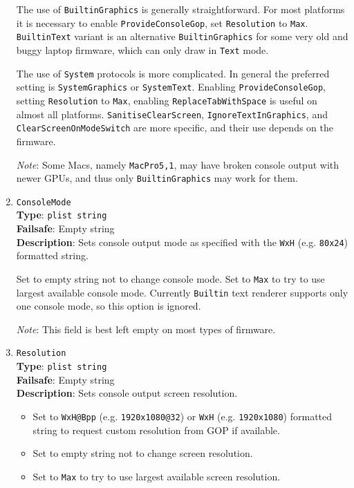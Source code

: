 \documentclass[]{article}
\providecommand{\tightlist}{%
  \setlength{\itemsep}{0pt}\setlength{\parskip}{0pt}}
\begin{document}
\begin{enumerate}
  The use of \texttt{BuiltinGraphics} is generally straightforward.
  For most platforms it is necessary to enable \texttt{ProvideConsoleGop},
  set \texttt{Resolution} to \texttt{Max}. \texttt{BuiltinText} variant is
  an alternative \texttt{BuiltinGraphics} for some very old and buggy laptop
  firmware, which can only draw in \texttt{Text} mode.

  The use of \texttt{System} protocols is more complicated. In general
  the preferred setting is \texttt{SystemGraphics} or \texttt{SystemText}.
  Enabling \texttt{ProvideConsoleGop}, setting \texttt{Resolution} to
  \texttt{Max}, enabling \texttt{ReplaceTabWithSpace} is useful on almost
  all platforms. \texttt{SanitiseClearScreen}, \texttt{IgnoreTextInGraphics},
  and \texttt{ClearScreenOnModeSwitch} are more specific, and their use
  depends on the firmware.

  \emph{Note}: Some Macs, namely \texttt{MacPro5,1}, may have broken
  console output with newer GPUs, and thus only \texttt{BuiltinGraphics}
  may work for them.

\item
  \texttt{ConsoleMode}\\
  \textbf{Type}: \texttt{plist\ string}\\
  \textbf{Failsafe}: Empty string\\
  \textbf{Description}: Sets console output mode as specified
  with the \texttt{WxH} (e.g. \texttt{80x24}) formatted string.

  Set to empty string not to change console mode. Set to \texttt{Max}
  to try to use largest available console mode. Currently
  \texttt{Builtin} text renderer supports only one console mode, so
  this option is ignored.

  \emph{Note}: This field is best left empty on most types of firmware.

\item
  \texttt{Resolution}\\
  \textbf{Type}: \texttt{plist\ string}\\
  \textbf{Failsafe}: Empty string\\
  \textbf{Description}: Sets console output screen resolution.

  \begin{itemize}
  \tightlist
  \item Set to \texttt{WxH@Bpp} (e.g. \texttt{1920x1080@32}) or \texttt{WxH}
  (e.g. \texttt{1920x1080}) formatted string to request custom resolution
  from GOP if available.
  \item Set to empty string not to change screen resolution.
  \item Set to \texttt{Max} to try to use largest available screen resolution.
  \end{itemize}


\end{enumerate}
\end{document}
